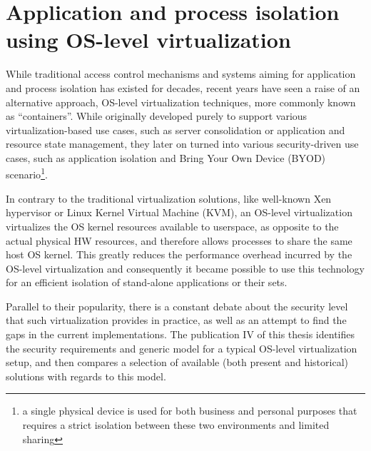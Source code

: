\section{Application and process isolation using OS-level virtualization}

While traditional access control mechanisms and systems aiming for application and process isolation has existed for decades, recent years have seen a raise of an alternative approach, OS-level virtualization techniques, more commonly known as "`containers"'. While originally developed purely to support various virtualization-based use cases, such as server consolidation or application and resource state management, they later on turned into various security-driven use cases, such as application isolation and Bring Your Own Device (BYOD) scenario\footnote{a single physical device is used for both business and personal purposes that requires a strict isolation between these two environments and limited sharing}.  

In contrary to the traditional virtualization solutions, like well-known Xen hypervisor or Linux Kernel Virtual Machine (KVM), an OS-level virtualization virtualizes the OS kernel resources available to userspace, as opposite to the actual physical HW resources, and therefore allows processes to share the same host OS kernel. This greatly reduces the performance overhead incurred by the OS-level virtualization and consequently it became possible to use this technology for an efficient isolation of stand-alone applications or their sets.

Parallel to their popularity, there is a constant debate about the security level that such virtualization provides in practice, as well as an attempt to find the gaps in the current implementations. The publication IV of this thesis identifies the security requirements and generic model for a typical OS-level virtualization setup, and then compares a selection of available (both present and historical) solutions with regards to this model. 


